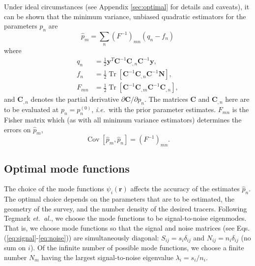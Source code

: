 \documentclass{article}
\newcommand{\ie}{\textit{i.e.}}
\newcommand{\etal}{\textit{et.~al.}}
\renewcommand{\vec}[1]{\bm{#1}}
\newcommand{\mat}[1]{\mathbf{#1}}
\renewcommand{\r}{\vec{r}}
\DeclareMathOperator{\Tr}{Tr}
\DeclareMathOperator{\Cov}{Cov}
\begin{document}
Under ideal circumstances (see Appendix \ref{sec:optimal} for details and
caveats), it can be shown that the minimum variance, unbiased quadratic
estimators for the parameters $p_n$ are
\begin{equation}
\label{eq:pm}
    \hat{p}_m = \sum_n (F^{-1})_{mn} \left(q_n - f_n \right)
\end{equation}
where
\begin{align}
\label{eq:qn}
    q_n &= \frac{1}{2} \mat{y}^T \mat{C}^{-1} \mat{C}_{,n} \mat{C}^{-1} \mat{y}, \\
\label{eq:fn}
    f_n &= \frac{1}{2} \Tr\left[ \mat{C}^{-1} \mat{C}_{,n} \mat{C}^{-1} \mat{N}\right], \\
\label{eq:Fmn}
    F_{mn} &= \frac{1}{2} \Tr\left[ \mat{C}^{-1} \mat{C}_{,m} \mat{C}^{-1} \mat{C}_{,n}\right],
\end{align}
and $\mat{C}_{,n}$ denotes the partial derivative
$\partial \mat{C}/\partial p_n$.  The matrices $\mat{C}$ and $\mat{C}_{,n}$
here are to be evaluated at $p_n = p_n^{(0)}$, \ie~with the prior parameter
estimates.  $F_{mn}$ is the Fisher matrix which (as with all minimum variance
estimators) determines the errors on $\hat{p}_m$,
\begin{equation}
    \Cov[\hat{p}_m,\hat{p}_n] = (F^{-1})_{mn}.
\end{equation}


\subsection{Optimal mode functions}
\label{sec:klmodes}

The choice of the mode functions $\psi_i(\r)$ affects the accuracy of the
estimates $\hat{p}_n$.  The optimal choice depends on the parameters that are
to be estimated, the geometry of the survey, and the number density of the
desired tracers.  Following Tegmark \etal, we choose the mode functions to be
signal-to-noise eigenmodes.  That is, we choose mode functions so that the
signal and noise matrices (see Eqs. (\ref{eq:signal}-\ref{eq:noise})) are
simultaneously diagonal: $S_{ij} = s_i \delta_{ij}$ and $N_{ij} = n_i
\delta_{ij}$ (no sum on $i$).  Of the infinite number of possible mode
functions, we choose a finite number $N_m$ having the largest signal-to-noise
eigenvalue $\lambda_i = s_i/n_i$.
\end{document}
